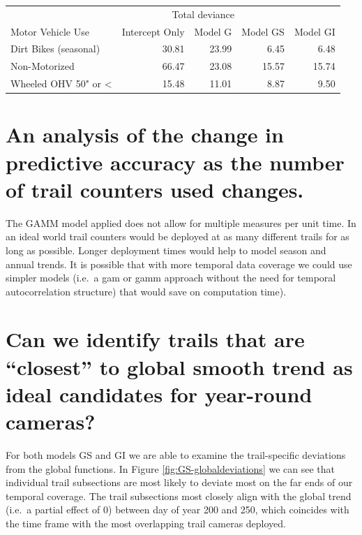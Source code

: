\documentclass[
]{book}
\begin{document}
\begin{table}
\centering
\begin{tabular}{lrrrr}
\toprule
\multicolumn{1}{c}{ } & \multicolumn{3}{c}{Total deviance} \\
\cmidrule(l{3pt}r{3pt}){2-4}
Motor Vehicle Use & Intercept Only & Model G & Model GS & Model GI\\
\midrule
Dirt Bikes (seasonal) & 30.81 & 23.99 & 6.45 & 6.48\\
Non-Motorized & 66.47 & 23.08 & 15.57 & 15.74\\
Wheeled OHV 50" or < & 15.48 & 11.01 & 8.87 & 9.50\\
\bottomrule
\end{tabular}
\end{table}

\hypertarget{an-analysis-of-the-change-in-predictive-accuracy-as-the-number-of-trail-counters-used-changes.}{%
\section{An analysis of the change in predictive accuracy as the number of trail counters used changes.}\label{an-analysis-of-the-change-in-predictive-accuracy-as-the-number-of-trail-counters-used-changes.}}

The GAMM model applied does not allow for multiple measures per unit time. In an ideal world trail counters would be deployed at as many different trails for as long as possible. Longer deployment times would help to model season and annual trends. It is possible that with more temporal data coverage we could use simpler models (i.e.~a gam or gamm approach without the need for temporal autocorrelation structure) that would save on computation time).

\hypertarget{can-we-identify-trails-that-are-closest-to-global-smooth-trend-as-ideal-candidates-for-year-round-cameras}{%
\section{Can we identify trails that are ``closest'' to global smooth trend as ideal candidates for year-round cameras?}\label{can-we-identify-trails-that-are-closest-to-global-smooth-trend-as-ideal-candidates-for-year-round-cameras}}

For both models GS and GI we are able to examine the trail-specific deviations from the global functions. In Figure \ref{fig:GS-globaldeviations} we can see that individual trail subsections are most likely to deviate most on the far ends of our temporal coverage. The trail subsections most closely align with the global trend (i.e.~a partial effect of 0) between day of year 200 and 250, which coincides with the time frame with the most overlapping trail cameras deployed.
\end{document}
